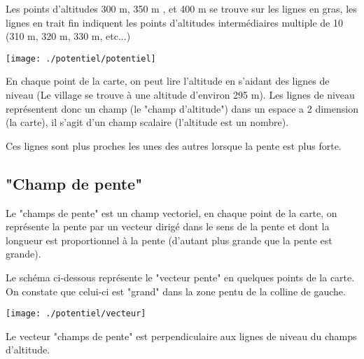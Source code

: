 Les points d'altitudes 300 m, 350 m , et 400 m se trouve sur les lignes en gras, les lignes en trait fin indiquent les points d'altitudes intermédiaires multiple de 10 (310 m, 320 m, 330 m, etc...)

\begin{center}
\texttt{[image: ./potentiel/potentiel]}
\end{center}


En chaque point de la carte, on peut lire l'altitude en s'aidant des lignes de niveau (Le village se trouve à une altitude d'environ 295 m). Les lignes de niveau représentent donc un champ (le "champ d'altitude") dans un espace a 2 dimension (la carte), il s'agit d'un champ scalaire (l'altitude est un nombre).

Ces lignes sont plus proches les unes des autres lorsque la pente est plus forte.


\vfill
\newpage
\subsection{"Champ de pente"}

Le "champs de pente" est un champ vectoriel, en chaque point de la carte, on représente la pente par un vecteur dirigé dans le sens de la pente et dont la longueur est proportionnel à la pente (d'autant plus grande que la pente est grande).

Le schéma ci-dessous représente le "vecteur pente" en quelques points de la carte. On constate que celui-ci est "grand" dans la zone pentu de la colline de gauche.

\begin{center}
\texttt{[image: ./potentiel/vecteur]}
\end{center}

Le vecteur "champs de pente" est perpendiculaire aux lignes de niveau du champs d'altitude.

\vfill
\newpage
